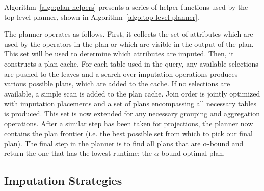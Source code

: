 Algorithm~\ref{algo:plan-helpers} presents a series of helper functions used by the top-level planner, shown in Algorithm~\ref{algo:top-level-planner}.

The planner operates as follows.
First, it collects the set of attributes which are used by the operators in the plan or which are visible in the output of the plan.
This set will be used to determine which attributes are imputed.
Then, it constructs a plan cache. For each table used in the query, any available selections are pushed to the leaves and
a search over imputation operations produces various possible plans, which are added to the cache. If no selections are available, a 
simple scan is added to the plan cache. Join order is jointly optimized with imputation placements and a set of
plans encompassing all necessary tables is produced. This set is now extended for any necessary grouping and aggregation
operations. After a similar step has been taken for projections, the planner now contains the plan frontier (i.e. the
best possible set from which to pick our final plan). The final step in the planner is to find all plans that are
$\alpha$-bound and return the one that has the lowest runtime: the $\alpha$-bound optimal plan.

\begin{algorithm}

\end{algorithm}

\begin{algorithm}

\end{algorithm}

%

\begin{algorithm}

\end{algorithm}

\subsection{Imputation Strategies}
\label{sec:imputation}

